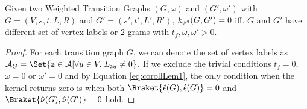 \begin{lemma}\label{lem:sdiss}
	Given two Weighted Transition Graphs $(G,\omega)$ and $(G',\omega')$ with $G=(V,s,t,L,R)$ and $G'=(s',t',L',R')$, $k_{{\phi^{g}}}(G,G')=0$ iff. $G$ and $G'$ have different set of vertex labels or $2$-grams with $t_f,\omega,\omega'>0$.
\end{lemma}
\begin{proof}
{For each transition graph $G$, we can denote the set of vertex labels as $\tasks_G=\Set{\const{a}\in\tasks|\forall u\in V.\; L_{\const{a}u}\neq 0}$.} If we exclude the trivial conditions $t_f=0$, $\omega=0$ or $\omega'=0$ and by Equation \ref{eq:corollLem1}, the only condition when the kernel returns zero is when both $\Braket{\hat{\epsilon}(G),\hat{\epsilon}(G)}=0$ and $\Braket{\hat{\nu}(G),\hat{\nu}(G')}=0$ hold.  
	

\end{proof}
